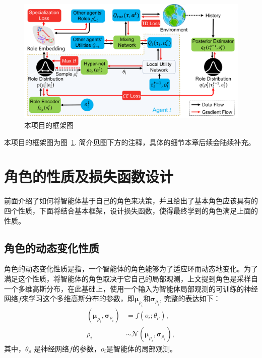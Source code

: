 \begin{figure}
    \centering
    \includegraphics[width=0.95\linewidth]{figures/framework/framework.pdf}
    \caption{本项目的框架图}
    \label{fig:framework}
\end{figure}

本项目的框架图为图~\ref{fig:framework}. 简介见图下方的注释，具体的细节本章后续会陆续补充。

\section{角色的性质及损失函数设计}
前面介绍了如何将智能体基于自己的角色来决策，并且给出了基本角色应该具有的四个性质，下面将结合基本框架，设计损失函数，使得最终学到的角色满足上面的性质。

\subsection{角色的动态变化性质}
角色的动态变化性质是指，一个智能体的角色能够为了适应环而动态地变化。为了满足这个性质，将智能体的角色取决于它自己的局部观测，上文提到角色是采样自一个多维高斯分布，在此基础上，使用一个输入为智能体局部观测的可训练的神经网络$f$来学习这个多维高斯分布的参数，即$\bm{\mu}_{\rho_i}$和$\bm{\sigma}_{\rho_i}$, 完整的表达如下：
\begin{equation}
\begin{aligned}
(\bm{\mu}_{\rho_i}, \bm{\sigma}_{\rho_i}) &= f(o_i; \theta_\rho), \\
\rho_i &\sim \mathcal{N}(\bm{\mu}_{\rho_i}, \bm{\sigma}_{\rho_i}),
\end{aligned}
\end{equation}
其中，$\theta_\rho$ 是神经网络$f$的参数，$o_i$是智能体的局部观测。

